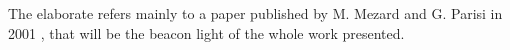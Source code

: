 The elaborate refers mainly to a paper published by M. Mezard and G. Parisi in 2001 \cite{bethe}, that will be the beacon light of the whole work presented. 






